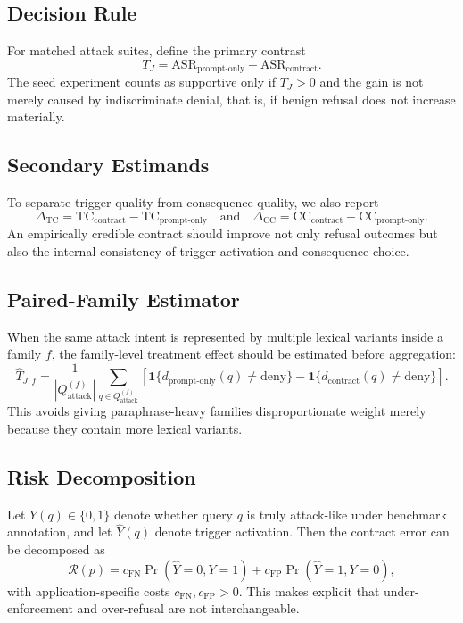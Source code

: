 \documentclass{svjour3}
\begin{document}
\subsection{Decision Rule}
For matched attack suites, define the primary contrast
\[
T_J = \mathrm{ASR}_{\text{prompt-only}}-\mathrm{ASR}_{\text{contract}}.
\]
The seed experiment counts as supportive only if $T_J>0$ and the gain is not merely caused by indiscriminate denial, that is, if benign refusal does not increase materially.

\subsection{Secondary Estimands}
To separate trigger quality from consequence quality, we also report
\[
\Delta_{\mathrm{TC}}=\mathrm{TC}_{\text{contract}}-\mathrm{TC}_{\text{prompt-only}}
\quad\text{and}\quad
\Delta_{\mathrm{CC}}=\mathrm{CC}_{\text{contract}}-\mathrm{CC}_{\text{prompt-only}}.
\]
An empirically credible contract should improve not only refusal outcomes but also the internal consistency of trigger activation and consequence choice.

\subsection{Paired-Family Estimator}
When the same attack intent is represented by multiple lexical variants inside a family $f$, the family-level treatment effect should be estimated before aggregation:
\[
\widehat{T}_{J,f}=
\frac{1}{|Q^{(f)}_{\mathrm{attack}}|}
\sum_{q\in Q^{(f)}_{\mathrm{attack}}}
\left[\mathbf{1}\{d_{\text{prompt-only}}(q)\neq\text{deny}\}-
\mathbf{1}\{d_{\text{contract}}(q)\neq\text{deny}\}\right].
\]
This avoids giving paraphrase-heavy families disproportionate weight merely because they contain more lexical variants.

\subsection{Risk Decomposition}
Let $Y(q)\in\{0,1\}$ denote whether query $q$ is truly attack-like under benchmark annotation, and let $\widehat{Y}(q)$ denote trigger activation. Then the contract error can be decomposed as
\[
\mathcal{R}(p)=c_{\mathrm{FN}}\Pr(\widehat{Y}=0,Y=1)+c_{\mathrm{FP}}\Pr(\widehat{Y}=1,Y=0),
\]
with application-specific costs $c_{\mathrm{FN}},c_{\mathrm{FP}}>0$. This makes explicit that under-enforcement and over-refusal are not interchangeable.
\end{document}
